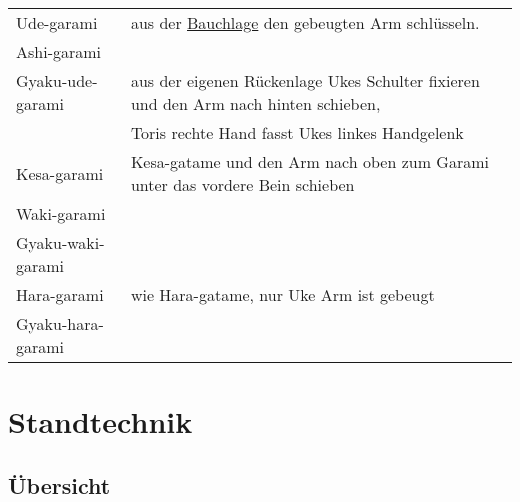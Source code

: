 \documentclass[justified, a4paper, notitlepage, captions=tableheading, nobib]{tufte-handout}
\begin{document}
\begin{center}
\begin{tabular}{ll}
\label{org934b11a}Ude-garami & aus der \hyperref[org69c958b]{Bauchlage} den gebeugten Arm schlüsseln.\\
\label{org51587ac}Ashi-garami & \\
\label{org263b62d}Gyaku-ude-garami & aus der eigenen Rückenlage Ukes Schulter fixieren und den Arm nach hinten schieben,\\
 & Toris rechte Hand fasst Ukes linkes Handgelenk\\
\label{orgfdc551e}Kesa-garami & Kesa-gatame und den Arm nach oben zum Garami unter das vordere Bein schieben\\
\label{org5f6193f}Waki-garami & \\
\label{org690fefb}Gyaku-waki-garami & \\
\label{org1829e59}Hara-garami & wie Hara-gatame, nur Uke Arm ist gebeugt\\
\label{org9ff6cc7}Gyaku-hara-garami & \\
\end{tabular}
\end{center}

\newpage
\section{Standtechnik }
\label{sec:org683cf34}

\subsection{Übersicht}
\label{sec:orgdbb01d7}
\end{document}
